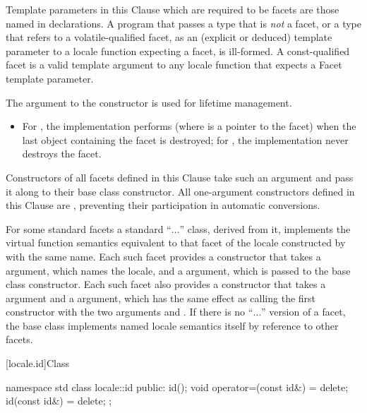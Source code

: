 \pnum
Template parameters in this Clause which are required to be facets are those named
in declarations.
A program that passes a type that is
\textit{not}
a facet, or a type that refers to a volatile-qualified facet, as an
(explicit or deduced) template parameter to a locale
function expecting a facet, is ill-formed. A const-qualified facet is a
valid template argument to any locale function that expects a Facet template
parameter.

\pnum
The 
argument to the constructor is used for lifetime management.

\begin{itemize}
\item
For
,
the implementation performs
(where
is a point\-er to the facet) when the last
object containing the facet is destroyed;
for
,
the implementation never destroys the facet.
\end{itemize}

\pnum
Constructors of all
facets defined in this Clause take such an argument and pass it
along to their
base class constructor.
All one-argument constructors defined
in this Clause are
,
preventing their participation in automatic conversions.

\pnum
For some standard facets a standard
``$\ldots$''
class, derived from it, implements the virtual function semantics
equivalent to that facet of the locale constructed by
with the same name.
Each such facet provides a constructor that takes a
argument, which names the locale, and a 
argument, which is passed to the base class constructor.
Each such facet also provides a constructor that takes a
 argument  and a 
argument, which has the same effect as calling the first constructor with the
two arguments  and .
If there is no
``$\ldots$''
version of a facet, the base class implements named locale
semantics itself by reference to other facets.

[locale.id]{Class }

%
%
\begin{codeblock}
namespace std {
  class locale::id {
  public:
    id();
    void operator=(const id&) = delete;
    id(const id&) = delete;
  };
}
\end{codeblock}

